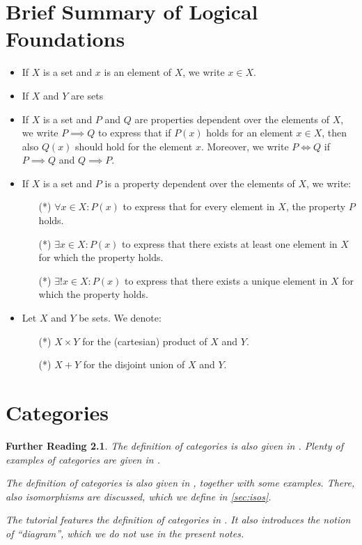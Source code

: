\documentclass[a4paper,11pt, oneside,titlepage=false]{scrbook}
\theoremstyle{plain}
\newtheorem*{reading*}{Further Reading}
\theoremstyle{definition}
\begin{document}
\chapter{Brief Summary of Logical Foundations}
\label{sec:notation}


\begin{itemize}
\item If $X$ is a set and $x$ is an element of $X$, we write $x \in X$.
\item If $X$ and $Y$ are sets
\item If $X$ is a set and $P$ and $Q$ are properties dependent over the elements of $X$, we write $P\implies Q$ to express that if $P(x)$ holds for an element $x\in X$, then also $Q(x)$ should hold for the element $x$. Moreover, we write $P \iff Q$ if $P\implies Q$ and $Q\implies P$.
\item If $X$ is a set and $P$ is a property dependent over the elements of $X$, we write:
\begin{itemize}
\item[(*)] $\forall x\in X: P(x)$ to express that for every element in $X$, the property $P$ holds.
\item[(*)] $\exists x\in X: P(x)$ to express that there exists at least one element in $X$ for which the property holds.
\item[(*)] $\exists! x\in X: P(x)$ to express that there exists a unique element in $X$ for which the property holds.
\end{itemize}
\item Let $X$ and $Y$ be sets. We denote:
\begin{itemize}
\item[(*)] $X\times Y$ for the (cartesian) product of $X$ and $Y$.
\item[(*)] $X + Y$ for the disjoint union of $X$ and $Y$.
\end{itemize}
\end{itemize}



\chapter{Categories}
\label{sec:categories}

\begin{reading*}
The definition of categories is also given in \cite[\S 2.1]{barr-wells}. Plenty of examples of categories are given in \cite[\S\S 2.3--2.5]{barr-wells}.

  The definition of categories is also given in \cite[\S 1.1]{leinster}, together with some examples.
  There, also isomorphisms are discussed, which we define in \cref{sec:isos}.

  The tutorial \cite{pierce} features the definition of categories in \cite[\S 2.1]{pierce}.
  It also introduces the notion of ``diagram'', which we do not use in the present notes.
\end{reading*}
\end{document}
